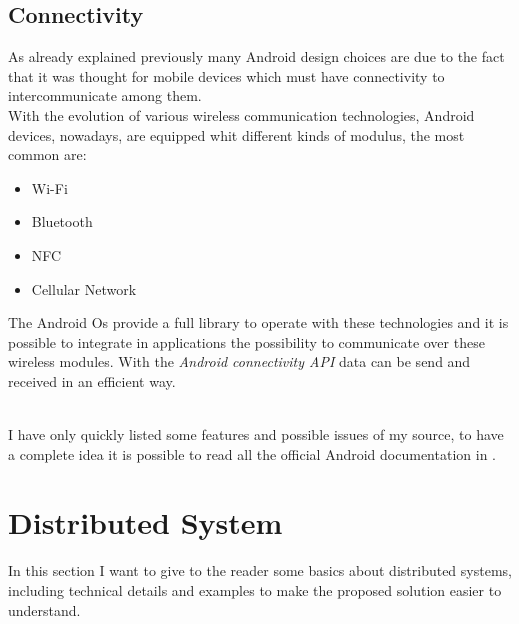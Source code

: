 \subsection{Connectivity}\label{connectivity}
\par
As already explained previously many Android design choices are due to the fact that it was thought for mobile devices which must have connectivity to intercommunicate among them.\\
With the evolution of various wireless communication technologies, Android devices, nowadays, are equipped whit different kinds of modulus, the most common are:
\begin{itemize}
	\item Wi-Fi
	\item Bluetooth
	\item NFC
	\item Cellular Network
\end{itemize}
The Android Os provide a full library to operate with these technologies and it is possible to integrate in applications the possibility to communicate over these wireless modules.
With the \textit{Android connectivity API} data can be send and received in an efficient way.\\\\
\par
I have only quickly listed some features and possible issues of my source, to have a complete idea it is possible to read all the official Android documentation in \cite{devandroifundamentals}.
 
\section{Distributed System} \label{distsys}
In this section I want to give to the reader some basics about distributed systems, including technical details and examples to make the proposed solution easier to understand.
